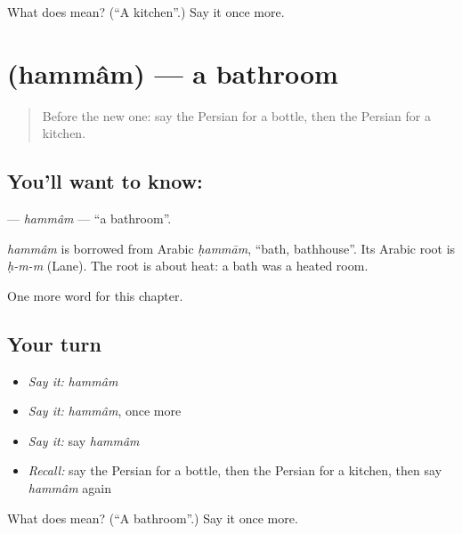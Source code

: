 \begin{tcolorbox}[breakable,colback=teal!4,colframe=teal!35!black,title={Before you move on}]
What does  mean? (\textquotedblleft{}A kitchen\textquotedblright{}.) Say it once more.
\end{tcolorbox}
\section[\texorpdfstring{\fa{حمام} (hammâm)}{حمام (hammâm)}]{ (hammâm) — a bathroom}

\label{lesson:FA-C48-hammam}



\begin{quote}
Before the new one: say the Persian for a bottle, then the Persian for a kitchen.
\end{quote}

\subsection*{You'll want to know: }
\textbf{} — \emph{hammâm} — \textquotedblleft{}a bathroom\textquotedblright{}.

\begin{cousinweb}
\emph{hammâm} is borrowed from Arabic \emph{ḥammām}, \textquotedblleft{}bath, bathhouse\textquotedblright{}. Its Arabic root is \emph{ḥ-m-m} (Lane). The root is about heat: a bath was a heated room.
\end{cousinweb}

\begin{grammarlens}[title={What you've built}]
One more word for this chapter.
\end{grammarlens}

\subsection*{Your turn}
\begin{itemize}
\raggedright
  \item \emph{Say it:} \emph{hammâm}
  \item \emph{Say it:} \emph{hammâm}, once more
  \item \emph{Say it:} say \emph{hammâm}
  \item \emph{Recall:} say the Persian for a bottle, then the Persian for a kitchen, then say \emph{hammâm} again
\end{itemize}

\begin{tcolorbox}[breakable,colback=teal!4,colframe=teal!35!black,title={Before you move on}]
What does  mean? (\textquotedblleft{}A bathroom\textquotedblright{}.) Say it once more.
\end{tcolorbox}
